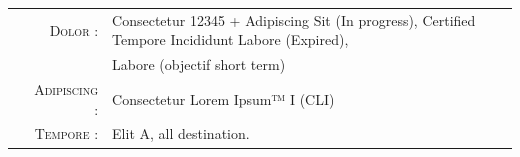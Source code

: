 %
%
%

\renewcommand{\arraystretch}{1.1}

\begin{tabular}{>{}r>{}p{13cm}} 
	\textsc{\faKey \ \ Dolor :}			&   Consectetur 12345 + Adipiscing Sit (In progress), Certified Tempore Incididunt Labore (Expired), \\& Labore (objectif short term) \\
	\textsc{\faCalendar \ \ Adipiscing :}			&   Consectetur Lorem Ipsum™ I (CLI) \\
	\textsc{\faCar \ \ Tempore :}			&   Elit A, all destination.
\end{tabular}
